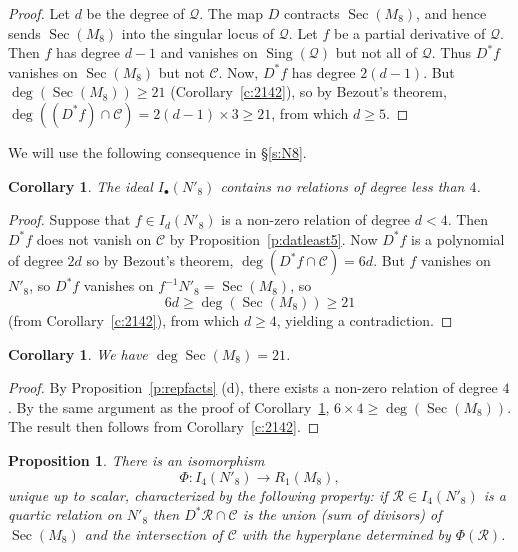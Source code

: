 \documentclass{amsart}
\newtheorem{corollary}[theorem]{Corollary}
\newtheorem{proposition}[theorem]{Proposition}
\theoremstyle{definition}
\theoremstyle{remark}
\DeclareMathOperator{\Sing}{Sing}
\DeclareMathOperator{\Sec}{Sec}
\def\cubic{\mathcal{C}}
\def\quintic{\mathcal{Q}}
\let\mc\mathcal
\begin{document}
\begin{proof}
Let $d$ be the degree of $\quintic$.  The map $D$ contracts $\Sec(M_8)$, and hence sends $\Sec(M_8)$ into the singular
locus of $\quintic$.  Let $f$ be a partial derivative of $\quintic$.  Then $f$ has degree $d-1$ and vanishes on 
$\Sing(\quintic)$ but not all of $\quintic$.  Thus $D^*f$ vanishes on $\Sec(M_8)$ but not $\cubic$.  Now, $D^*f$ has
degree $2(d-1)$.  But $\deg(\Sec(M_8)) \geq 21$ (Corollary~\ref{c:2142}), so by Bezout's theorem, $\deg((D^*f) \cap \cubic)
= 2(d-1) \times 3  \geq 21$, from which $d \geq 5$.\end{proof}

We will use the following consequence in \S \ref{s:N8}.

\begin{corollary}
\label{c:united}
The ideal $I_{\bullet}(N'_8)$ contains no relations of degree less than $4$.
\end{corollary}

\begin{proof}
Suppose that $f \in I_d(N'_8)$ is a non-zero relation of degree $d<4$.  Then $D^*f$ does not vanish on $\cubic$ by
Proposition~\ref{p:datleast5}.  Now $D^*f$ is a polynomial of degree $2d$ so by Bezout's theorem,
$\deg(D^* f \cap \cubic) = 6d$.  But $f$ vanishes on $N'_8$, so $D^*f$ vanishes on $f^{-1} N'_8 = \Sec(M_8)$, so
\begin{displaymath}
6d \geq \deg( \Sec(M_8)) \geq 21
\end{displaymath}
(from Corollary~\ref{c:2142}), from which $d \geq 4$, yielding a contradiction.
\end{proof}

\begin{corollary}
We have $\deg \Sec(M_8) = 21$.\label{c:21}
\end{corollary}

\begin{proof}
By Proposition~\ref{p:repfacts} (d), there exists a non-zero  relation
of degree $4$. 
By the same argument as the proof of Corollary~\ref{c:united},
$6\times 4  \geq \deg ( \Sec(M_8))$.    The result then follows from Corollary~\ref{c:2142}.\end{proof}

\begin{proposition}
\label{prop:I4}
There is an isomorphism
\begin{displaymath}
\Phi:I_4(N'_8) \to R_1(M_8),
\end{displaymath}
unique up to scalar, 
characterized by the following property:  if $\mc{R} \in I_4(N'_8)$ is a quartic relation on $N'_8$ then $D^*\mc{R}
\cap \cubic$ is the union (sum of divisors) of $\Sec(M_8)$ and the intersection of $\cubic$ with the hyperplane determined by
$\Phi(\mc{R})$.  
\end{proposition}
\end{document}
